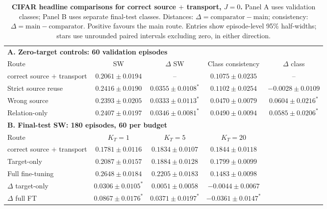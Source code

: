 \documentclass{article}
\newcommand{\KT}{K_T}
\newcommand{\sigstar}{^{\ast}}
\begin{document}
\begin{table}[t]
\centering\footnotesize\setlength{\tabcolsep}{5pt}
\caption{\textbf{CIFAR headline comparisons for correct source $+$ transport, $J=0$.} Panel A uses validation classes; Panel B uses separate final-test classes. Distances: $\Delta=\mathrm{comparator}-\mathrm{main}$; consistency: $\Delta=\mathrm{main}-\mathrm{comparator}$. Positive favours the main route. Entries show episode-level 95\% half-widths; stars use unrounded paired intervals excluding zero, in either direction.}
\label{tab:cifar-main}
\begin{tabular}{lcccc}
\toprule
\multicolumn{5}{l}{\textbf{A. Zero-target controls: 60 validation episodes}}\\
Route & SW & $\Delta$ SW & Class consistency & $\Delta$ class\\
\midrule
\shortstack[l]{correct source\\$+$ transport} & $0.2061\pm0.0194$ & -- & $0.1075\pm0.0235$ & --\\
Strict source reuse & $0.2416\pm0.0190$ & $0.0355\pm0.0108\sigstar$ & $0.1102\pm0.0254$ & $-0.0028\pm0.0109$\\
Wrong source & $0.2393\pm0.0205$ & $0.0333\pm0.0113\sigstar$ & $0.0470\pm0.0079$ & $0.0604\pm0.0216\sigstar$\\
Relation-only & $0.2407\pm0.0197$ & $0.0346\pm0.0081\sigstar$ & $0.0490\pm0.0094$ & $0.0585\pm0.0206\sigstar$\\
\midrule
\multicolumn{5}{l}{\textbf{B. Final-test SW: 180 episodes, 60 per budget}}\\
Route & $\KT=1$ & $\KT=5$ & $\KT=20$ & \\
\midrule
\shortstack[l]{correct source\\$+$ transport} & $0.1781\pm0.0116$ & $0.1834\pm0.0107$ & $0.1844\pm0.0118$ & \\
Target-only & $0.2087\pm0.0157$ & $0.1884\pm0.0128$ & $0.1799\pm0.0099$ & \\
Full fine-tuning & $0.2648\pm0.0184$ & $0.2205\pm0.0183$ & $0.1483\pm0.0098$ & \\
$\Delta$ target-only & $0.0306\pm0.0105\sigstar$ & $0.0051\pm0.0058$ & $-0.0044\pm0.0067$ & \\
$\Delta$ full FT & $0.0867\pm0.0176\sigstar$ & $0.0371\pm0.0197\sigstar$ & $-0.0361\pm0.0147\sigstar$ & \\
\bottomrule
\end{tabular}
\end{table}
\end{document}
